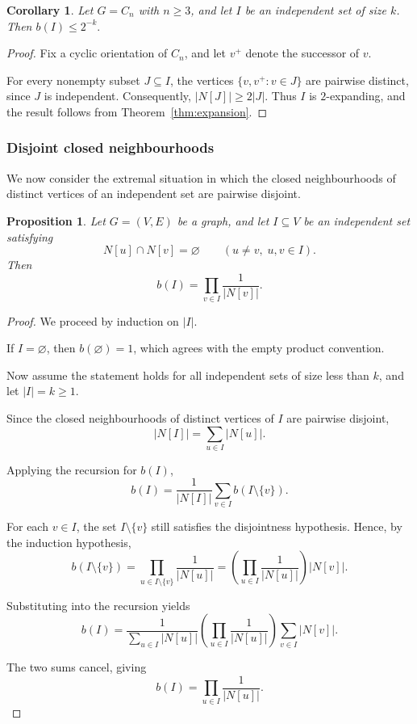 \documentclass[11pt,a4paper]{article}
\numberwithin{equation}{section}
\theoremstyle{plain}
\newtheorem{proposition}[theorem]{Proposition}
\newtheorem{corollary}[theorem]{Corollary}
\theoremstyle{definition}
\theoremstyle{remark}
\begin{document}
\begin{corollary}
\label{cor:cycle_bound}
Let \(G=C_n\) with \(n\ge3\), and let \(I\) be an independent set of size \(k\). Then
\(
b(I)\le 2^{-k}.
\)
\end{corollary}

\begin{proof}
Fix a cyclic orientation of \(C_n\), and let \(v^+\) denote the successor of \(v\).

For every nonempty subset \(J\subseteq I\), the vertices
\(
\{v,v^+ : v\in J\}
\)
are pairwise distinct, since \(J\) is independent. Consequently,
\(
|N[J]|\ge 2|J|.
\)
Thus \(I\) is \(2\)-expanding, and the result follows from Theorem~\ref{thm:expansion}.
\end{proof}

\subsubsection{Disjoint closed neighbourhoods}
\label{subsec:disjoint_neighbourhoods}

We now consider the extremal situation in which the closed neighbourhoods of distinct vertices of an independent set are pairwise disjoint. 

\begin{proposition}
\label{prop:disjoint}
Let \(G=(V,E)\) be a graph, and let \(I\subseteq V\) be an independent set satisfying
\[
N[u]\cap N[v]=\varnothing
\qquad
(u\neq v,\;u,v\in I).
\]
Then
\[
b(I)
=
\prod_{v\in I}
\frac1{|N[v]|}.
\]
\end{proposition}

\begin{proof}
We proceed by induction on \(|I|\).

If \(I=\varnothing\), then \(b(\varnothing)=1\), which agrees with the empty product convention.

Now assume the statement holds for all independent sets of size less than \(k\), and let \(|I|=k\ge1\).

Since the closed neighbourhoods of distinct vertices of \(I\) are pairwise disjoint,
\[
|N[I]|
=
\sum_{u\in I}|N[u]|.
\]

Applying the recursion for \(b(I)\),
\[
b(I)
=
\frac1{|N[I]|}
\sum_{v\in I}
b(I\setminus\{v\}).
\]

For each \(v\in I\), the set \(I\setminus\{v\}\) still satisfies the disjointness hypothesis. Hence, by the induction hypothesis,
\[
b(I\setminus\{v\})
=
\prod_{u\in I\setminus\{v\}}
\frac1{|N[u]|}
=
\left(
\prod_{u\in I}
\frac1{|N[u]|}
\right)
|N[v]|.
\]

Substituting into the recursion yields
\[
b(I)
=
\frac1{\sum_{u\in I}|N[u]|}
\left(
\prod_{u\in I}
\frac1{|N[u]|}
\right)
\sum_{v\in I}|N[v]|.
\]

The two sums cancel, giving
\[
b(I)
=
\prod_{u\in I}
\frac1{|N[u]|}.
\]
\end{proof}
\end{document}
